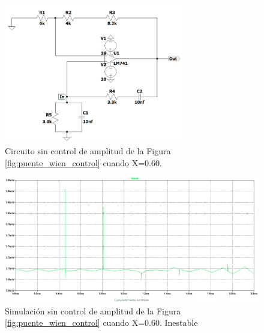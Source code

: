 \begin{enumerate}
\begin{itemize}
                      \begin{figure}[H]
                        \centering
                        \setcounter{figure}{5}
                        \includegraphics[width=8cm]{Imagenes/sim_cir_puente_wien_sc4.png}
                        \caption{Circuito sin control de amplitud de la Figura \ref{fig:puente_wien_control} cuando X=0.60.}
                        \label{fig:sim_cir_puente_wien_sc4}
                    \end{figure}

                    \begin{figure}[H]
                        \centering
                        \renewcommand{\figurename}{Gráfica}
                        \setcounter{figure}{1}
                        \includegraphics[width=15cm]{Imagenes/sim_puente_wien_sc4.png}
                        \caption{Simulación sin control de amplitud de la Figura \ref{fig:puente_wien_control} cuando X=0.60. Inestable}
                        \label{fig:sim_puente_wien_sc4}
                    \end{figure}


\end{itemize}
\end{enumerate}
